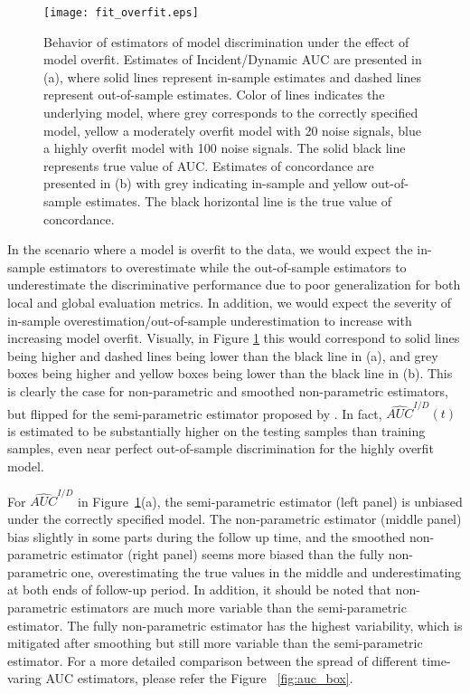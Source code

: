 \documentclass[useAMS,usenatbib, referee]{biom}
\begin{document}
\begin{figure}
\centering
\texttt{[image: fit\_overfit.eps]}
\caption{Behavior of estimators of model discrimination under the effect of model overfit.  Estimates of Incident/Dynamic AUC are presented in (a), where solid lines represent in-sample estimates and dashed lines represent out-of-sample estimates. Color of lines indicates the underlying model, where grey corresponds to the correctly specified model, yellow a moderately overfit model with 20 noise signals, blue a highly overfit model with 100 noise signals. The solid black line represents true value of AUC. Estimates of concordance are presented in (b) with grey indicating in-sample and yellow out-of-sample estimates. The black horizontal line is the true value of concordance.}
\label{fig:overfit}
\end{figure}

In the scenario where a model is overfit to the data, we would expect the in-sample estimators to overestimate while the out-of-sample estimators to underestimate the discriminative performance due to poor generalization for both local and global evaluation metrics. In addition, we would expect the severity of in-sample overestimation/out-of-sample underestimation to increase with increasing model overfit. Visually, in Figure \ref{fig:overfit} this would correspond to solid lines being higher and dashed lines being lower than the black line in (a), and grey boxes being higher and yellow boxes being lower than the black line in (b). This is clearly the case for non-parametric and smoothed non-parametric estimators, but flipped for the semi-parametric estimator proposed by \citet{hz2005}. In fact, $\hat{AUC}^{I/D}(t)$ is estimated to be substantially higher on the testing samples than training samples, even near perfect out-of-sample discrimination for the highly overfit model. 

For $\hat{AUC}^{I/D}$ in Figure~\ref{fig:overfit}(a), the semi-parametric estimator (left panel) is unbiased  under the correctly specified model. The non-parametric estimator (middle panel) bias slightly in some parts during the follow up time, and the smoothed non-parametric estimator (right panel) seems more biased than the fully non-parametric one, overestimating the true values in the middle and underestimating at both ends of follow-up period. In addition, it should be noted that non-parametric estimators are much more variable than the semi-parametric estimator. The fully non-parametric estimator has the highest variability, which is mitigated after smoothing but still more variable than the semi-parametric estimator. For a more detailed comparison between the spread of different time-varing AUC estimators, please refer the Figure ~\ref{fig:auc_box}.
\end{document}
